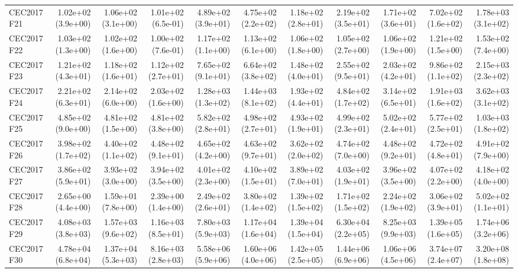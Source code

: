 \begin{longtable}{lrrrrrrrrrr}
CEC2017 F21 & 1.02e+02 (3.9e+00) & 1.06e+02 (3.1e+00) & 1.01e+02 (6.5e-01) & 4.89e+02 (3.9e+01) & 4.75e+02 (2.2e+02) & 1.18e+02 (2.8e+01) & 2.19e+02 (3.5e+01) & 1.71e+02 (3.6e+01) & 7.02e+02 (1.6e+02) & 1.78e+03 (3.1e+02) \\
CEC2017 F22 & 1.03e+02 (1.3e+00) & 1.02e+02 (1.6e+00) & 1.00e+02 (7.6e-01) & 1.17e+02 (1.1e+00) & 1.13e+02 (6.1e+00) & 1.06e+02 (1.8e+00) & 1.05e+02 (2.7e+00) & 1.06e+02 (1.9e+00) & 1.21e+02 (1.5e+00) & 1.53e+02 (7.4e+00) \\
CEC2017 F23 & 1.21e+02 (4.3e+01) & 1.18e+02 (1.6e+01) & 1.12e+02 (2.7e+01) & 7.65e+02 (9.1e+01) & 6.64e+02 (3.8e+02) & 1.48e+02 (4.0e+01) & 2.55e+02 (9.5e+01) & 2.03e+02 (4.2e+01) & 9.86e+02 (1.1e+02) & 2.15e+03 (2.3e+02) \\
CEC2017 F24 & 2.21e+02 (6.3e+01) & 2.14e+02 (6.0e+00) & 2.03e+02 (1.6e+00) & 1.28e+03 (1.3e+02) & 1.44e+03 (8.1e+02) & 1.93e+02 (4.4e+01) & 4.84e+02 (1.7e+02) & 3.14e+02 (6.5e+01) & 1.91e+03 (1.6e+02) & 3.62e+03 (3.1e+02) \\
CEC2017 F25 & 4.85e+02 (9.0e+00) & 4.81e+02 (1.5e+00) & 4.81e+02 (3.8e+00) & 5.82e+02 (2.8e+01) & 4.98e+02 (2.7e+01) & 4.93e+02 (1.9e+01) & 4.99e+02 (2.3e+01) & 5.02e+02 (2.4e+01) & 5.77e+02 (2.5e+01) & 1.03e+03 (1.8e+02) \\
CEC2017 F26 & 3.98e+02 (1.7e+02) & 4.40e+02 (1.1e+02) & 4.48e+02 (9.1e+01) & 4.65e+02 (4.2e+00) & 4.63e+02 (9.7e+01) & 3.62e+02 (2.0e+02) & 4.74e+02 (7.0e+00) & 4.48e+02 (9.2e+01) & 4.72e+02 (4.8e+01) & 4.91e+02 (7.9e+00) \\
CEC2017 F27 & 3.86e+02 (5.9e+01) & 3.93e+02 (3.0e+00) & 3.94e+02 (3.5e+00) & 4.01e+02 (2.3e+00) & 4.10e+02 (1.5e+01) & 3.89e+02 (7.0e+01) & 4.03e+02 (1.9e+01) & 3.96e+02 (3.5e+00) & 4.07e+02 (2.2e+00) & 4.18e+02 (4.0e+00) \\
CEC2017 F28 & 2.65e+00 (4.4e+00) & 1.59e+01 (7.8e+00) & 2.39e+00 (1.4e+00) & 2.49e+02 (2.6e+01) & 3.80e+02 (1.4e+02) & 1.39e+02 (1.5e+02) & 1.71e+02 (1.5e+02) & 2.24e+02 (1.9e+02) & 3.06e+02 (3.9e+01) & 5.02e+02 (1.1e+01) \\
CEC2017 F29 & 4.08e+03 (3.8e+03) & 1.57e+03 (9.6e+02) & 1.16e+03 (8.5e+01) & 7.80e+03 (5.9e+03) & 1.17e+04 (1.6e+04) & 1.39e+04 (1.5e+04) & 6.30e+04 (2.2e+05) & 8.25e+03 (9.9e+03) & 1.39e+05 (1.6e+05) & 1.74e+06 (3.2e+06) \\
CEC2017 F30 & 4.78e+04 (6.8e+04) & 1.37e+04 (5.3e+03) & 8.16e+03 (2.8e+03) & 5.58e+06 (5.9e+06) & 1.60e+06 (4.0e+06) & 1.42e+05 (2.5e+05) & 1.44e+06 (6.9e+06) & 1.06e+06 (4.5e+06) & 3.74e+07 (2.4e+07) & 3.20e+08 (1.8e+08) \\

\end{longtable}
